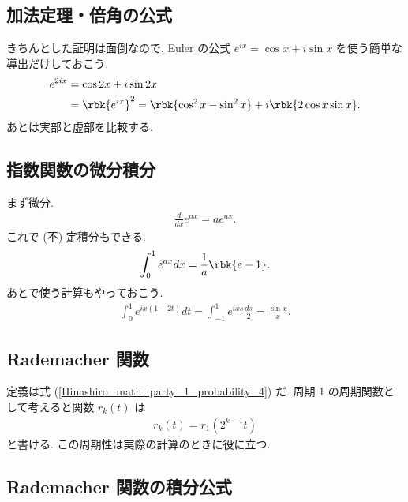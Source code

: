 \documentclass[openany, a4paper, oneside]{jsbook}
\begin{document}
\subsection{加法定理・倍角の公式 \label{Hinashiro_math_party_1_probability_17}}

きちんとした証明は面倒なので, Euler の公式 $e^{ix} = \cos x + i \sin x$ を使う簡単な導出だけしておこう.
\begin{align}
 e^{2 i x}
 &=
 \cos 2x + i \sin 2x \\
 &=
 \rbk{e^{ix}}^2
 =
 \rbk{ \cos^2 x - \sin^2 x} + i \rbk{2 \cos x \sin x}.
\end{align}
あとは実部と虚部を比較する.
\subsection{指数関数の微分積分}

まず微分.
\begin{align}
 \frac{d}{dx} e^{ax} = a e^{ax}.
\end{align}
これで (不) 定積分もできる.
\begin{align}
 \int_0^1 e^{ax} dx = \frac{1}{a} \rbk{e - 1}.
\end{align}
あとで使う計算もやっておこう.
\begin{align}
 \int_0^1 e^{ix (1 - 2t)} dt
 =
 \int_{-1}^{1} e^{ixs} \frac{ds}{2}
 =
 \frac{\sin x}{x}.
\end{align}
\subsection{Rademacher 関数}

定義は式 (\ref{Hinashiro_math_party_1_probability_4}) だ.
周期 1 の周期関数として考えると関数 $r_k (t)$ は
\begin{align}
 r_k (t) = r_1 (2^{k-1} t) \label{Hinashiro_math_party_1_probability_11}
\end{align}
と書ける.
この周期性は実際の計算のときに役に立つ.
\subsection{Rademacher 関数の積分公式 \label{Hinashiro_math_party_1_probability_16}}
\end{document}
